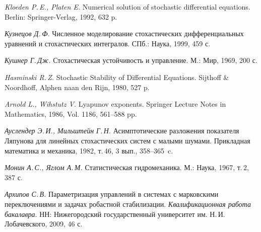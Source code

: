 \begin{thebibliography}{wlab}
\emph{Kloeden P.\,E., Platen E.}
\newblock Numerical solution of stochastic differential equations.
\newblock Berlin: Springer-Verlag, 1992, 632 p.

\emph{Кузнецов Д.\,Ф.}
\newblock Численное моделирование стохастических дифференциальных уравнений и стохастических интегралов.
\newblock СПб.: Наука, 1999, 459 с.

\emph{Кушнер Г.\,Дж.}
\newblock Стохастическая устойчивость и управление.
\newblock М.: Мир, 1969, 200 с.

\emph{Hasminski R.\,Z.}
\newblock Stochastic Stability of Differential Equations.
\newblock Sijthoff \& Noordhoff, Alphen naan den Rijn, 1980, 527 p.

\emph{Arnold L., Wihstutz V.}
\newblock Lyapunov exponents.
\newblock Springer Lecture Notes in Mathematics, 1986, Vol. 1186, 561--588 pp.

\emph{Ауслендер Э.\,И., Мильштейн Г.\,Н.}
\newblock Асимптотические разложения показателя Ляпунова для линейных стохастических систем с малыми шумами.
\newblock Прикладная математика и механика, 1982, т.\,46, 3 вып., 358--365~c.


\emph{Монин А.\,С., Яглом А.\,М.}
\newblock Статистическая гидромеханика.
\newblock М.: Наука, 1967, т.\,2, 387 с.

\emph{Архипов С.\,В.}
\newblock Параметризация управлений в системах с марковскими переключениями и задачах робастной стабилизации.
\newblock \emph{Квалификационная работа бакалавра}.
\newblock НН: Нижегородский государственный университет им. Н.\,И.\,Лобачевского, 2009, 46 с.

\end{thebibliography}

